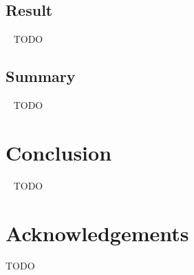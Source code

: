 \documentclass[9pt,conference]{IEEEtran}
\begin{document}
    \subsection{Result}~\label{section:case_result}
    TODO

    \subsection{Summary}~\label{section:case_summary}
    TODO

    \section{Conclusion}~\label{section:conclusion}
    TODO

    \section*{Acknowledgements}
    TODO

    
    
\end{document}

